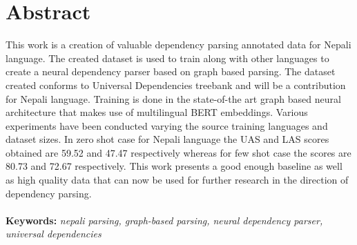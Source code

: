 \section*{Abstract}
This work is a creation of valuable dependency parsing annotated data for
Nepali language. The created dataset is used to train along with other
languages to create a neural dependency parser based on graph based parsing.
The dataset created conforms to Universal Dependencies treebank and
will be a contribution for Nepali language. Training is done in the
state-of-the art graph based neural architecture that makes use of
multilingual BERT embeddings. Various experiments have been conducted
varying the source training languages and dataset sizes. In zero shot
case for Nepali language the UAS and LAS scores obtained are 59.52 and
47.47 respectively whereas for few shot case the scores are 80.73 and
72.67 respectively. This work presents a good enough baseline as well
as high quality data that can now be used for further research in the
direction of dependency parsing.
\\~\\
\textbf{Keywords: }\textit{nepali parsing, graph-based parsing, neural dependency parser, universal dependencies}
